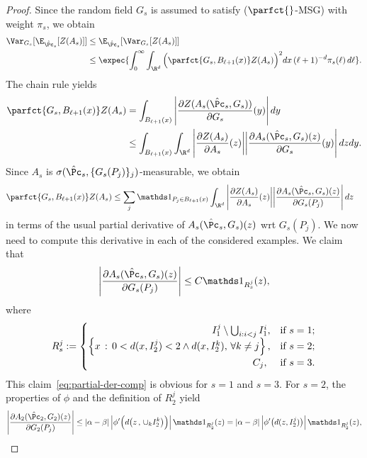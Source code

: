 \begin{proof}
\noindent Since the random field $G_s$ is assumed to satisfy ($\parfct{}$-MSG) with weight $\pi_s$, we obtain
\begin{equation}\label{eq:mixex-0}
\begin{aligned}
\Var_{G_s}[\E_{\hat\Pc_s}[Z(A_s)]]&\le\E_{\hat\Pc_s}[\Var_{G_s}[Z(A_s)]]\\
&\le \expec{\int_0^\infty\int_{\R^d}\Big(\parfct{G_s,B_{\ell+1}(x)}Z(A_s)\Big)^2dx\,(\ell+1)^{-d}\pi_s(\ell)\,d\ell}.
\end{aligned}
\end{equation}
The chain rule yields
\begin{align*}
\parfct{G_s,B_{\ell+1}(x)}Z(A_s)&=\int_{B_{\ell+1}(x)}\left|\frac{\partial Z(A_s(\hat\Pc_s,G_s))}{\partial G_s}(y)\right|dy\\
&\le\int_{B_{\ell+1}(x)}\int_{\R^d}\left|\frac{\partial Z(A_s)}{\partial A_s}(z)\bigg|\bigg|\frac{\partial A_s(\hat\Pc_s,G_s)(z)}{\partial G_s}(y)\right|dzdy.
\end{align*}
Since $A_s$ is $\sigma(\hat\Pc_s,\{G_s(P_j)\}_j)$-measurable, we obtain
\begin{align}\label{eq:mixex-1}
\parfct{G_s,B_{\ell+1}(x)}Z(A_s)&\le\sum_j\mathds1_{P_j\in B_{\ell+1}(x)}\int_{\R^d}\left|\frac{\partial Z(A_s)}{\partial A_s}(z)\bigg|\bigg|\frac{\partial A_s(\hat\Pc_s,G_s)(z)}{\partial G_s(P_j)}\right|dz
\end{align}
in terms of the usual partial derivative of $A_s(\hat\Pc_s,G_s)(z)$ wrt $G_s(P_j)$. We now need to compute this derivative in each of the considered examples. We claim that
\begin{align}\label{eq:partial-der-comp}
\left|\frac{\partial A_s(\hat\Pc_s,G_s)(z)}{\partial G_s(P_j)}\right|\le C\mathds1_{R_s^j}(z),
\end{align}
where
\[
R_s^j:=
\begin{cases}
\mkern225mu I_1^j\setminus \bigcup_{i:i<j}I_1^i,&\text{if }s=1;\\
\left\{x\,:\, 0<d(x,I_2^j)< 2\wedge d(x,I_2^k),\,\forall k\ne j\right\},&\text{if }s=2;\\
\mkern299mu C_j,&\text{if }s=3.
\end{cases}
\]
This claim~\eqref{eq:partial-der-comp} is obvious for $s=1$ and $s=3$. For $s=2$, the properties of $\phi$ and the definition of $R_2^j$ yield
\[
\left|\frac{\partial A_2(\hat\Pc_2,G_2)(z)}{\partial G_2(P_j)}\right|\le |\alpha-\beta|\left|\phi'\Big(d\big(z\,,\,\cup_kI_2^k\big)\Big)\right|\mathds1_{R_2^j}(z)=|\alpha-\beta|\left|\phi'\big(d(z,I_2^j)\big)\right|\mathds1_{R_2^j}(z),
\]
\end{proof}

